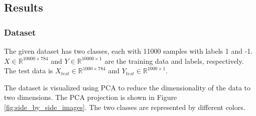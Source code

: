 \documentclass{article}
\begin{document}
\subsection{Results}
\subsubsection{Dataset}

The given dataset has two classes, each with 11000 samples with labels 1 and -1. $X \in \mathbb{R}^{10000 \times 784}$ and $Y \in \mathbb{R}^{10000 \times 1}$ are the training data and labels, respectively. The test data is $X_{test} \in \mathbb{R}^{1000 \times 784}$ and $Y_{test} \in \mathbb{R}^{1000 \times 1}$. 

The dataset is visualized using PCA to reduce the dimensionality of the data to two dimensions. The PCA projection is shown in Figure \ref{fig:side_by_side_images}. 
The two classes are represented by different colors.
\end{document}
